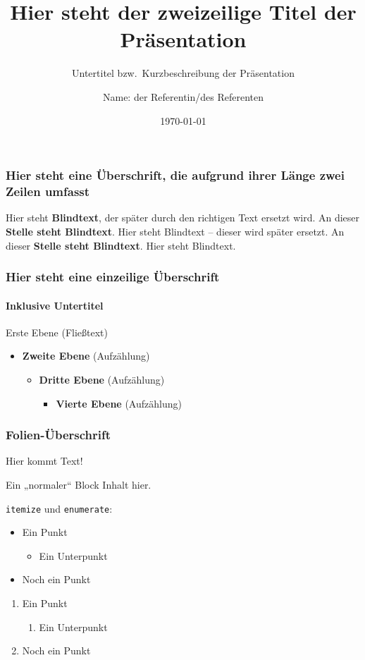 \documentclass[german, ngerman]{beamer}
\title[Hier steht der Titel der Präsentation]{Hier steht der zweizeilige Titel der Präsentation}
\subtitle{Untertitel bzw.\ Kurzbeschreibung der Präsentation}
\author{Name: der Referentin/des Referenten}
\date{\today}
\begin{document}
\begin{frame}
	\titlepage
\end{frame}

\begin{frame}
	\frametitle{Hier steht eine Überschrift, die aufgrund ihrer Länge zwei Zeilen umfasst}

	Hier steht \textbf{Blindtext}, der später durch den richtigen Text ersetzt wird.
	An dieser \textbf{Stelle steht Blindtext}.
	Hier steht Blindtext – dieser wird später ersetzt.
	An dieser \textbf{Stelle steht Blindtext}.
	Hier steht Blindtext.
\end{frame}

\begin{frame}
	\frametitle{Hier steht eine einzeilige Überschrift}
	\framesubtitle{Inklusive Untertitel}

	Erste Ebene (Fließtext)
	\begin{itemize}
		\item \textbf{Zweite Ebene} (Aufzählung)
		\begin{itemize}
			\item \textbf{Dritte Ebene} (Aufzählung)
			\begin{itemize}
				\item \textbf{Vierte Ebene} (Aufzählung)
			\end{itemize}
		\end{itemize}
	\end{itemize}
\end{frame}

\begin{frame}
	\frametitle{Folien-Überschrift}

	Hier kommt Text!

	\begin{block}{Ein „normaler“ Block}
		Inhalt hier.
	\end{block}

	\texttt{itemize} und \texttt{enumerate}:
	\begin{itemize}
		\item Ein Punkt
		\begin{itemize}
			\item Ein Unterpunkt
		\end{itemize}
		\item Noch ein Punkt
	\end{itemize}
	\begin{enumerate}
		\item Ein Punkt
		\begin{enumerate}
			\item Ein Unterpunkt
		\end{enumerate}
		\item Noch ein Punkt
	\end{enumerate}
\end{frame}
\end{document}

